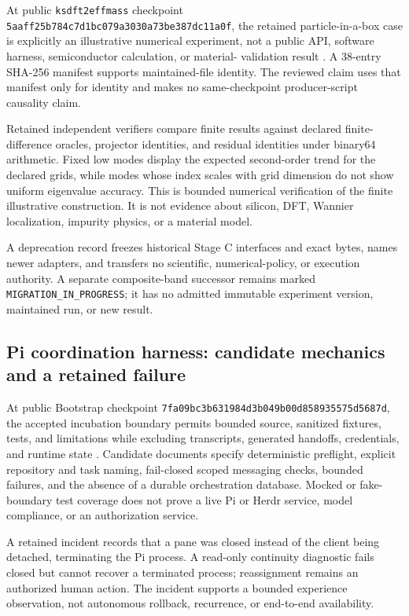 \documentclass[11pt]{article}
\begin{document}
At public \texttt{ksdft2effmass} checkpoint
\texttt{5aaff25b784c7d1bc079a3030a73be387dc11a0f}, the retained
particle-in-a-box case is explicitly an illustrative numerical experiment, not
a public API, software harness, semiconductor calculation, or material-
validation result \citep{ksdft2effmass_2026}. A 38-entry SHA-256 manifest
supports maintained-file identity. The reviewed claim uses that manifest only
for identity and makes no same-checkpoint producer-script causality claim.

Retained independent verifiers compare finite results against declared
finite-difference oracles, projector identities, and residual identities under
binary64 arithmetic. Fixed low modes display the expected second-order trend
for the declared grids, while modes whose index scales with grid dimension do
not show uniform eigenvalue accuracy. This is bounded numerical verification of
the finite illustrative construction. It is not evidence about silicon, DFT,
Wannier localization, impurity physics, or a material model.

A deprecation record freezes historical Stage C interfaces and exact bytes,
names newer adapters, and transfers no scientific, numerical-policy, or
execution authority. A separate composite-band successor remains marked
\texttt{MIGRATION\_IN\_PROGRESS}; it has no admitted immutable experiment
version, maintained run, or new result.

\subsection{Pi coordination harness: candidate mechanics and a retained failure}

At public Bootstrap checkpoint
\texttt{7fa09bc3b631984d3b049b00d858935575d5687d}, the accepted incubation
boundary permits bounded source, sanitized fixtures, tests, and limitations
while excluding transcripts, generated handoffs, credentials, and runtime
state \citep{projectkoios_bootstrap_2026}. Candidate documents specify
deterministic preflight, explicit repository and task naming, fail-closed scoped
messaging checks, bounded failures, and the absence of a durable orchestration
database. Mocked or fake-boundary test coverage does not prove a live Pi or Herdr
service, model compliance, or an authorization service.

A retained incident records that a pane was closed instead of the client being
detached, terminating the Pi process. A read-only continuity diagnostic fails
closed but cannot recover a terminated process; reassignment remains an
authorized human action. The incident supports a bounded experience observation,
not autonomous rollback, recurrence, or end-to-end availability.
\end{document}
